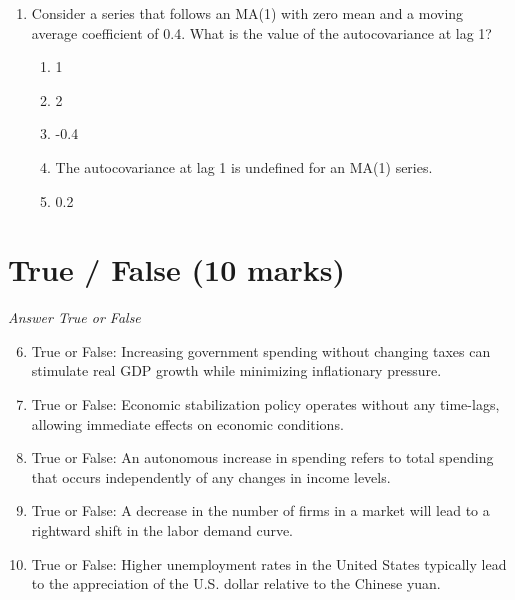 \documentclass[12pt]{article}
\begin{document}
\begin{enumerate}[label=\arabic*.]
\begin{enumerate}[label=(\alph*)]
    \item Real GDP will decrease.
    \item The unemployment rate will increase.
    \item The country's trade balance will worsen.
    \item The interest rate will decrease.
    \item The price level will increase.
\end{enumerate}
\item Consider a series that follows an MA(1) with zero mean and a moving average coefficient of 0.4. What is the value of the autocovariance at lag 1?
\begin{enumerate}[label=(\alph*)]
    \item 1
    \item 2
    \item -0.4
    \item The autocovariance at lag 1 is undefined for an MA(1) series.
    \item 0.2
\end{enumerate}
\end{enumerate}

\section*{True / False (10 marks)}
\textit{Answer True or False}
\begin{enumerate}[label=\arabic*.]
\setcounter{enumi}{5}
\item True or False: Increasing government spending without changing taxes can stimulate real GDP growth while minimizing inflationary pressure.
\item True or False: Economic stabilization policy operates without any time-lags, allowing immediate effects on economic conditions.
\item True or False: An autonomous increase in spending refers to total spending that occurs independently of any changes in income levels.
\item True or False: A decrease in the number of firms in a market will lead to a rightward shift in the labor demand curve.
\item True or False: Higher unemployment rates in the United States typically lead to the appreciation of the U.S. dollar relative to the Chinese yuan.
\end{enumerate}
\end{document}
